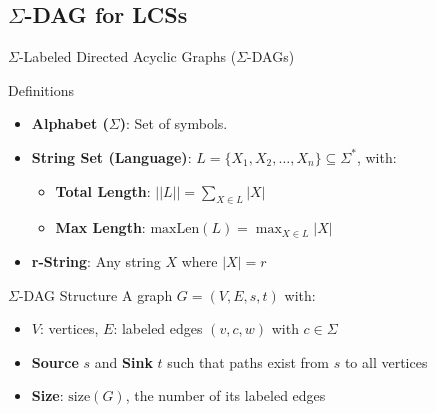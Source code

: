 \documentclass{beamer}
\begin{document}
\subsection{$\Sigma$-DAG for LCSs}
\begin{frame}{$\Sigma$-Labeled Directed Acyclic Graphs ($\Sigma$-DAGs)}

    \begin{block}{Definitions}
        \begin{itemize}
            \item \textbf{Alphabet ($\Sigma$)}: Set of symbols.
            \item \textbf{String Set (Language)}: \( L = \{ X_1, X_2, \dots, X_n \} \subseteq \Sigma^* \), with:
            \begin{itemize}
                \item \textbf{Total Length}: \( ||L|| = \sum_{X \in L} |X| \)
                \item \textbf{Max Length}: \( \text{maxLen}(L) = \max_{X \in L} |X| \)
            \end{itemize}
            \item \textbf{r-String}: Any string \( X \) where \( |X| = r \)
        \end{itemize}
    \end{block}

    \begin{block}{$\Sigma$-DAG Structure}
        A graph \( G = (V, E, s, t) \) with:
        \begin{itemize}
            \item \( V \): vertices, \( E \): labeled edges \( (v, c, w) \) with \( c \in \Sigma \)
            \item \textbf{Source} \( s \) and \textbf{Sink} \( t \) such that paths exist from \( s \) to all vertices
            \item \textbf{Size}: \( \text{size}(G) \), the number of its labeled edges
        \end{itemize}
    \end{block}
\end{frame}
\end{document}

